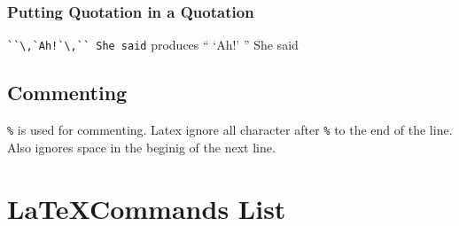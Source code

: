 \documentclass[11pt]{article}
\begin{document}
\subsubsection{Putting Quotation in a Quotation}

\verb=``\,`Ah!`\,`` She said= produces ``\,\,`Ah!'\,\,'' She said

\subsection{Commenting}

\verb=%= is used for commenting. Latex ignore all character after \verb=%= to the end of the line. Also ignores space in the beginig of the next line.

\section{\LaTeX Commands List}
\end{document}
